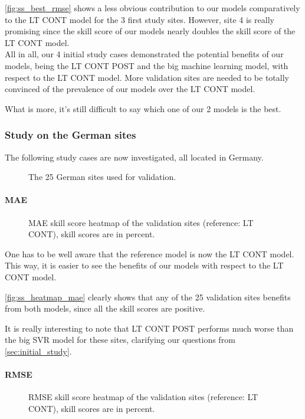 \autoref{fig:ss_best_rmse} shows a less obvious contribution to our models comparatively to the LT CONT model for the 3 first study sites.
However, site 4 is really promising since the skill score of our models nearly doubles the  skill score of the LT CONT model. \\

All in all, our 4 initial study cases demonstrated the potential benefits of our models, being the LT CONT POST and the big machine learning model, with respect to the LT CONT model.
More validation sites are needed to be totally convinced of the prevalence of our models over the LT CONT model.

What is more, it's still difficult to say which one of our 2 models is the best.
\newpage
\subsubsection{Study on the German sites}

The following study cases are now investigated, all located in Germany.
\begin{figure}[htb!]
    \centering
    
\caption{The 25 German sites used for validation.}

\end{figure}
\newpage
\paragraph{MAE}\indent
\begin{figure}[htb!]
    \centering
    
\caption{MAE skill score heatmap of the validation sites (reference: LT CONT), skill scores are in percent.}
\label{fig:ss_heatmap_mae}
\end{figure}

One has to be well aware that the reference model is now the LT CONT model. This way, it is easier to see the benefits of our models with respect to the LT CONT model.

\autoref{fig:ss_heatmap_mae} clearly shows that any of the 25 validation sites benefits from both models, since all the skill scores are positive.

It is really interesting to note that LT CONT POST performs much worse than the big SVR model for these sites, clarifying our questions from \ref{sec:initial_study}.
\newpage

\paragraph{RMSE}\indent
\begin{figure}[htb!]
    \centering
    
\caption{RMSE skill score heatmap of the validation sites (reference: LT CONT), skill scores are in percent.}
\end{figure}


